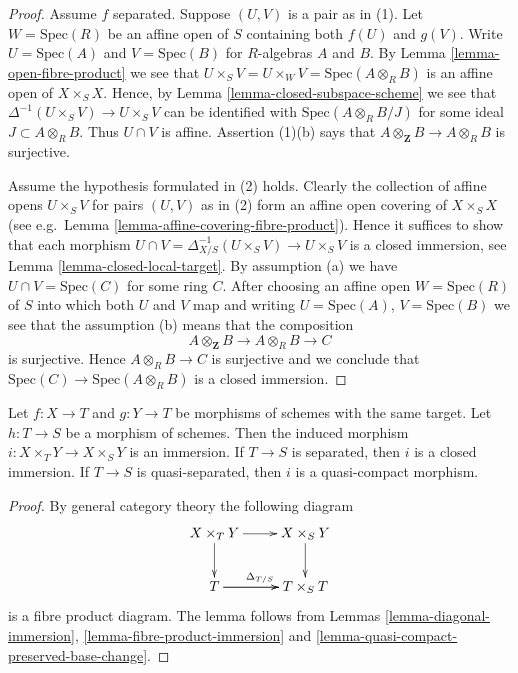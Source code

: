 \begin{proof}
Assume $f$ separated. Suppose $(U, V)$ is a pair as in (1).
Let $W = \text{Spec}(R)$ be an affine open of $S$ containing
both $f(U)$ and $g(V)$. Write $U = \text{Spec}(A)$ and
$V = \text{Spec}(B)$ for $R$-algebras $A$ and $B$.
By Lemma \ref{lemma-open-fibre-product} we see that
$U \times_S V = U \times_W V = \text{Spec}(A \otimes_R B)$
is an affine open of $X \times_S X$. Hence, by
Lemma \ref{lemma-closed-subspace-scheme} we see that
$\Delta^{-1}(U \times_S V) \to U \times_S V$
can be identified with $\text{Spec}(A \otimes_R B/J)$
for some ideal $J \subset A \otimes_R B$.
Thus $U \cap V$ is affine. Assertion (1)(b) says that
$A \otimes_{\mathbf{Z}} B \to A \otimes_R B$ is surjective.

\medskip\noindent
Assume the hypothesis formulated in (2) holds.
Clearly the collection of affine opens $U \times_S V$
for pairs $(U, V)$ as in (2) form an affine open covering
of $X \times_S X$ (see e.g.\ Lemma \ref{lemma-affine-covering-fibre-product}).
Hence it suffices to show that each morphism
$U \cap V = \Delta_{X/S}^{-1}(U \times_S V) \to U\times_S V$
is a closed immersion, see Lemma \ref{lemma-closed-local-target}.
By assumption (a) we have $U \cap V = \text{Spec}(C)$ for some ring $C$.
After choosing an affine open $W = \text{Spec}(R)$ of $S$
into which both $U$ and $V$ map and writing $U = \text{Spec}(A)$,
$V = \text{Spec}(B)$ we see that the assumption (b) means
that the composition
$$
A \otimes_{\mathbf{Z}} B \to A \otimes_R B \to C
$$
is surjective. Hence $A \otimes_R B \to C$ is surjective and
we conclude that $\text{Spec}(C) \to \text{Spec}(A \otimes_R B)$
is a closed immersion.
\end{proof}

\begin{lemma}
\label{lemma-fibre-product-after-map}
Let $f : X \to T$ and $g : Y \to T$ be morphisms of schemes
with the same target. Let $h : T \to S$ be a morphism of schemes.
Then the induced morphism $i : X \times_T Y \to X \times_S Y$ is
an immersion. If $T \to S$ is separated, then $i$ is a closed
immersion. If $T \to S$ is quasi-separated, then $i$ is a
quasi-compact morphism.
\end{lemma}

\begin{proof}
By general category theory the following diagram
$$
\xymatrix{
X \times_T Y \ar[r] \ar[d] & X \times_S Y \ar[d] \\
T \ar[r]^{\Delta_{T/S}} \ar[r] & T \times_S T
}
$$
is a fibre product diagram. The lemma follows
from Lemmas \ref{lemma-diagonal-immersion},
\ref{lemma-fibre-product-immersion} and
\ref{lemma-quasi-compact-preserved-base-change}.
\end{proof}






